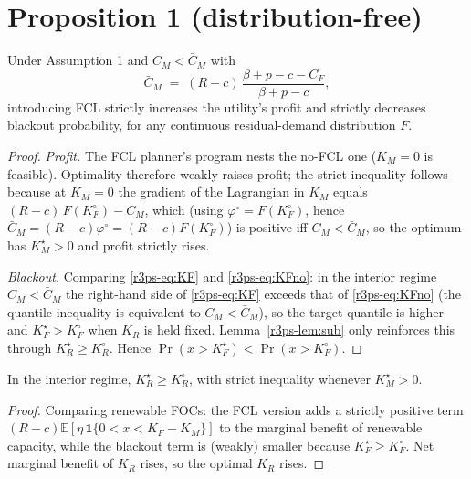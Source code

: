 \section{Proposition 1 (distribution-free)}
\begin{proposition}\label{r3ps-prop:1}
Under Assumption 1 and $C_M<\bar C_M$ with
\[
\bar C_M \;=\; (R-c)\,\frac{\beta+p-c-C_F}{\beta+p-c},
\]
introducing FCL strictly increases the utility's profit and strictly decreases blackout probability, for any continuous residual-demand distribution $F$.
\end{proposition}

\begin{proof}
\emph{Profit.} The FCL planner's program nests the no-FCL one ($K_M=0$ is feasible). Optimality therefore weakly raises profit; the strict inequality follows because at $K_M=0$ the gradient of the Lagrangian in $K_M$ equals $(R-c)\,F(K_F^{\circ})-C_M$, which (using $\varphi^{\circ}=F(K_F^{\circ})$, hence $\bar C_M=(R-c)\varphi^{\circ}=(R-c)F(K_F^{\circ})$) is positive iff $C_M<\bar C_M$, so the optimum has $K_M^{\star}>0$ and profit strictly rises.

\emph{Blackout.} Comparing \eqref{r3ps-eq:KF} and \eqref{r3ps-eq:KFno}: in the interior regime $C_M<\bar C_M$ the right-hand side of \eqref{r3ps-eq:KF} exceeds that of \eqref{r3ps-eq:KFno} (the quantile inequality is equivalent to $C_M<\bar C_M$), so the target quantile is higher and $K_F^{\star}>K_F^{\circ}$ when $K_R$ is held fixed. Lemma~\ref{r3ps-lem:sub} only reinforces this through $K_R^{\star}\ge K_R^{\circ}$. Hence $\Pr(x>K_F^{\star})<\Pr(x>K_F^{\circ})$.
\end{proof}

\begin{lemma}\label{r3ps-lem:sub}
In the interior regime, $K_R^{\star}\ge K_R^{\circ}$, with strict inequality whenever $K_M^{\star}>0$.
\end{lemma}

\begin{proof}
Comparing renewable FOCs: the FCL version adds a strictly positive term $(R-c)\mathbb E[\eta\,\mathbf 1\{0<x<K_F-K_M\}]$ to the marginal benefit of renewable capacity, while the blackout term is (weakly) smaller because $K_F^{\star}\ge K_F^{\circ}$. Net marginal benefit of $K_R$ rises, so the optimal $K_R$ rises.
\end{proof}

